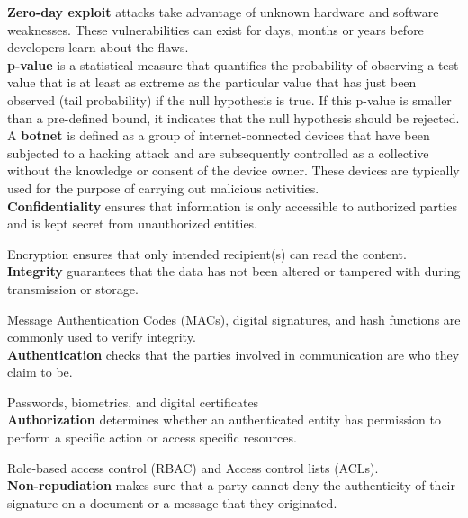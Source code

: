 \documentclass[pdflatex,sn-mathphys-num]{sn-jnl}%
\theoremstyle{thmstyleone}%
\theoremstyle{thmstyletwo}%
\theoremstyle{thmstylethree}%
\begin{document}
\noindent \textbf{Zero-day exploit} attacks take advantage of unknown hardware and software weaknesses. These vulnerabilities can exist for days, months or years before developers learn about the flaws.\\

\noindent \textbf{p-value} is a statistical measure that quantifies the probability of observing a test value that is at least as extreme as the particular value that has just been observed (tail probability) if the null hypothesis is true. If this p-value is smaller than a pre-defined bound, it indicates that the null hypothesis should be rejected. \\

\noindent A \textbf{botnet}  is defined as a group of internet-connected devices that have been subjected to a hacking attack and are subsequently controlled as a collective without the knowledge or consent of the device owner. These devices are typically used for the purpose of carrying out malicious activities. \\



    
\noindent \textbf{Confidentiality}  ensures that information is only accessible to authorized parties and is kept secret from unauthorized entities.

 Encryption ensures that only intended recipient(s) can read the content.\\


\noindent \textbf{Integrity} guarantees that the data has not been altered or tampered with during transmission or storage.

 Message Authentication Codes (MACs), digital signatures, and hash functions are commonly used to verify integrity.\\


\noindent \textbf{Authentication}  checks that the parties involved in communication are who they claim to be.

 Passwords, biometrics, and digital certificates\\


\noindent \textbf{Authorization} determines whether an authenticated entity has permission to perform a specific action or access specific resources.

 Role-based access control (RBAC) and Access control lists (ACLs).\\


\noindent \textbf{Non-repudiation} makes sure that a party cannot deny the authenticity of their signature on a document or a message that they originated.
\end{document}
